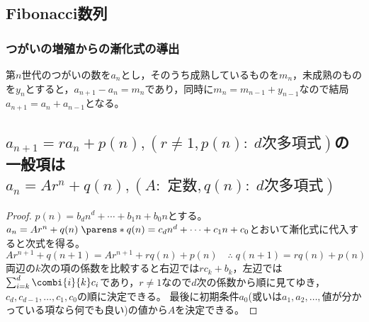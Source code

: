         \subsection{Fibonacci数列}
            \subsubsection{つがいの増殖からの漸化式の導出}
                第$n$世代のつがいの数を$a_n$とし，そのうち成熟しているものを$m_n$，未成熟のものを$y_n$とすると，$a_{n+1} - a_n = m_n$であり，同時に$m_n = m_{n-1} + y_{n-1}$なので結局$a_{n+1} = a_n + a_{n-1}$となる。
        \subsection{\texorpdfstring{$a_{n+1}=ra_n + p(n),(r\neq1 ,p(n):\;d\text{次多項式})$}{a\_\{n+1\} = ra\_n + p(n) (r≠1, p(n): d次多項式)}の一般項は\texorpdfstring{$a_n = Ar^n + q(n),(A:\text{ 定数},q(n):\;d\text{次多項式})$}{a\_n = Ar\string^n + q(n) (A: 定数, q(n): d次多項式)}}
            \begin{proof}
                $p(n) = b_dn^d + \dotsb + b_1n + b_0n$とする。
                $a_n = Ar^n + q(n)\;\parens*{q(n) = c_dn^d + \dotsb + c_1n + c_0}$とおいて漸化式に代入すると次式を得る。
                \[ Ar^{n+1} + q(n+1) = Ar^{n+1} + rq(n) + p(n) \quad \therefore\; q(n+1) = rq(n) + p(n) \]
                両辺の$k$次の項の係数を比較すると右辺では$rc_k + b_k$，左辺では$\sum_{i=k}^d\combi{i}{k}c_i$であり，$r\neq 1$なので$d$次の係数から順に見てゆき，$c_d,c_{d-1},\dotsc,c_1,c_0$の順に決定できる。
                最後に初期条件$a_0$(或いは$a_1,a_2,\dotsc,$\;値が分かっている項なら何でも良い)の値から$A$を決定できる。
            \end{proof}
